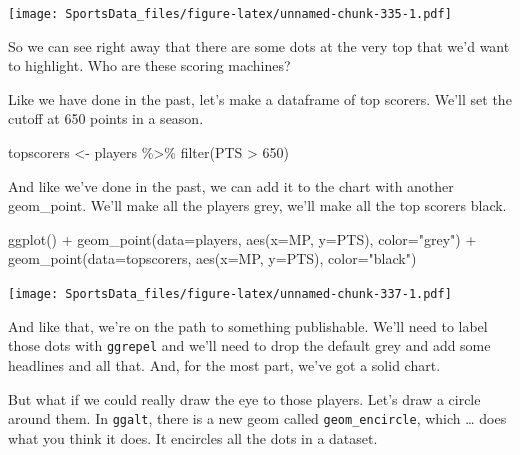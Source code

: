 \documentclass[
]{book}
\newenvironment{Shaded}{\begin{snugshade}}{\end{snugshade}}
\newcommand{\AttributeTok}[1]{\textcolor[rgb]{0.77,0.63,0.00}{#1}}
\newcommand{\DecValTok}[1]{\textcolor[rgb]{0.00,0.00,0.81}{#1}}
\newcommand{\FunctionTok}[1]{\textcolor[rgb]{0.00,0.00,0.00}{#1}}
\newcommand{\NormalTok}[1]{#1}
\newcommand{\OtherTok}[1]{\textcolor[rgb]{0.56,0.35,0.01}{#1}}
\newcommand{\SpecialCharTok}[1]{\textcolor[rgb]{0.00,0.00,0.00}{#1}}
\newcommand{\StringTok}[1]{\textcolor[rgb]{0.31,0.60,0.02}{#1}}
\begin{document}
\texttt{[image: SportsData\_files/figure-latex/unnamed-chunk-335-1.pdf]}

So we can see right away that there are some dots at the very top that we'd want to highlight. Who are these scoring machines?

Like we have done in the past, let's make a dataframe of top scorers. We'll set the cutoff at 650 points in a season.

\begin{Shaded}
\begin{Highlighting}[]
\NormalTok{topscorers }\OtherTok{\textless{}{-}}\NormalTok{ players }\SpecialCharTok{\%\textgreater{}\%} \FunctionTok{filter}\NormalTok{(PTS }\SpecialCharTok{\textgreater{}} \DecValTok{650}\NormalTok{)}
\end{Highlighting}
\end{Shaded}

And like we've done in the past, we can add it to the chart with another geom\_point. We'll make all the players grey, we'll make all the top scorers black.

\begin{Shaded}
\begin{Highlighting}[]
\FunctionTok{ggplot}\NormalTok{() }\SpecialCharTok{+} \FunctionTok{geom\_point}\NormalTok{(}\AttributeTok{data=}\NormalTok{players, }\FunctionTok{aes}\NormalTok{(}\AttributeTok{x=}\NormalTok{MP, }\AttributeTok{y=}\NormalTok{PTS), }\AttributeTok{color=}\StringTok{"grey"}\NormalTok{) }\SpecialCharTok{+} \FunctionTok{geom\_point}\NormalTok{(}\AttributeTok{data=}\NormalTok{topscorers, }\FunctionTok{aes}\NormalTok{(}\AttributeTok{x=}\NormalTok{MP, }\AttributeTok{y=}\NormalTok{PTS), }\AttributeTok{color=}\StringTok{"black"}\NormalTok{)}
\end{Highlighting}
\end{Shaded}

\texttt{[image: SportsData\_files/figure-latex/unnamed-chunk-337-1.pdf]}

And like that, we're on the path to something publishable. We'll need to label those dots with \texttt{ggrepel} and we'll need to drop the default grey and add some headlines and all that. And, for the most part, we've got a solid chart.

But what if we could really draw the eye to those players. Let's draw a circle around them.
In \texttt{ggalt}, there is a new geom called \texttt{geom\_encircle}, which \ldots{} does what you think it does. It encircles all the dots in a dataset.
\end{document}
